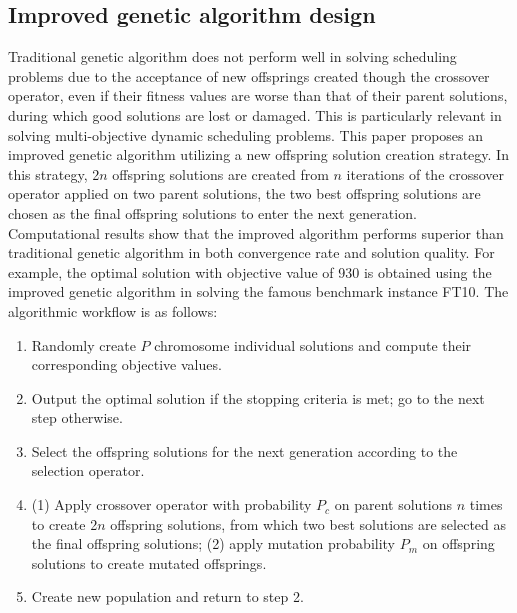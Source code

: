 \subsection{Improved genetic algorithm design}
Traditional genetic algorithm does not perform well in solving scheduling problems due to the acceptance of new offsprings created though the crossover operator, even if their fitness values are worse than that of their parent solutions, during which good solutions are lost or damaged.
This is particularly relevant in solving multi-objective dynamic scheduling problems.
This paper proposes an improved genetic algorithm utilizing a new offspring solution creation strategy.
In this strategy, 2$n$ offspring solutions are created from $n$ iterations of the crossover operator applied on two parent solutions, the two best offspring solutions are chosen as the final offspring solutions to enter the next generation.
Computational results show that the improved algorithm performs superior than traditional genetic algorithm in both convergence rate and solution quality.
For example, the optimal solution with objective value of 930 is obtained using the improved genetic algorithm in solving the famous benchmark instance FT10.
The algorithmic workflow is as follows:
\begin{enumerate}
	\item Randomly create $P$ chromosome individual solutions and compute their corresponding objective values.
	\item Output the optimal solution if the stopping criteria is met; go to the next step otherwise.
	\item Select the offspring solutions for the next generation according to the selection operator.
	\item (1) Apply crossover operator with probability $P_c$ on parent solutions $n$ times to create 2$n$ offspring solutions, from which two best solutions are selected as the final offspring solutions; (2) apply mutation probability $P_m$ on offspring solutions to create mutated offsprings.
	\item Create new population and return to step 2.
\end{enumerate}
